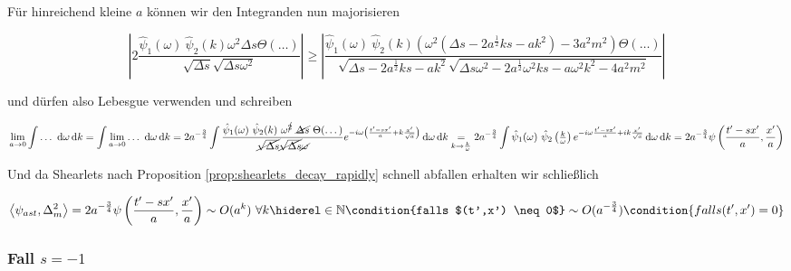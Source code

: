 Für hinreichend kleine $a$ können wir den Integranden nun majorisieren

\begin{dmath*}
    \left|
    2 \frac{
        \hat\psi_1(\omega) ~\hat\psi_2(k) \omega^2 \Delta s \Theta(\dots)}
    {
        \sqrt{\Delta s} \sqrt{\Delta s \omega^2}
    }
    \right|
    \geq
    \left|
    \frac{
        \hat\psi_1(\omega)~ \hat\psi_2(k) \left(
        \omega^2 \left(\Delta s - 2 a^{\frac{1}{2}} k s - ak^2
                \right) - 3a^2m^2
        \right)
         \Theta(\dots)
     }
     {
        \sqrt{\Delta s -2a^{\frac{1}{2}}ks - ak^2}
            \sqrt{\Delta s \omega^2 -2a^{\frac{1}{2}} \omega^2 k s
                    - a\omega^2k^2-4 a^2 m^2}
     }
    \right|
\end{dmath*}

und dürfen also Lebesgue verwenden und schreiben

\begin{dmath*}
    \lim_{a \rightarrow 0} \int \dots ~\d \omega \d k
    = \int \lim_{a \rightarrow 0} \dots ~\d \omega \d k
    = 2 a^{-\frac{3}{4}} \int
    \frac{\hat\psi_1(\omega) ~\hat\psi_2(k) ~\omega^{\cancel{2}}
        ~\cancel{\Delta s} ~\Theta(\dots)
    }
    {
        \cancel{\sqrt{\Delta s}}\cancel{\sqrt{\Delta s}}\cancel{\omega}
    }
    e^{-i \omega \left(\frac{t'-sx'}{a} + k \frac{x'}{\sqrt{a}}\right)}
    \d \omega \d k
    \underset{k\rightarrow \frac{k}{\omega}}{=}
    2 a^{-\frac{3}{4}} \int
    \hat\psi_1(\omega) ~\hat\psi_2\left(\tfrac{k}{\omega}\right)
    e^{-i\omega \frac{t'-sx'}{a} + ik \frac{x'}{\sqrt{a}}}
    \d \omega \d k \\
    =
    2 a^{-\frac{3}{4}} \psi \left(\frac{t'-sx'}{a}, \frac{x'}{a}\right)
\end{dmath*}

Und da Shearlets nach Proposition \ref{prop:shearlets_decay_rapidly} schnell abfallen erhalten wir schließlich

\begin{dmath}
\label{eq:delta_m2_s<1}
    \left\langle \psi_{ast},\Delta_m^{2}\right\rangle
    = 2 a^{-\frac{3}{4}} \psi \left(\frac{t'-sx'}{a}, \frac{x'}{a}\right)
    \sim O(a^k) ~\forall k \hiderel \in \mathbb{N} \condition{falls $(t',x') \neq 0$}
    \sim O(a^{-\frac{3}{4}}) \condition{falls (t',x') = 0}
\end{dmath}

\subsubsection*{\texorpdfstring{Fall $s = -1$}{Fall s = 1}}

